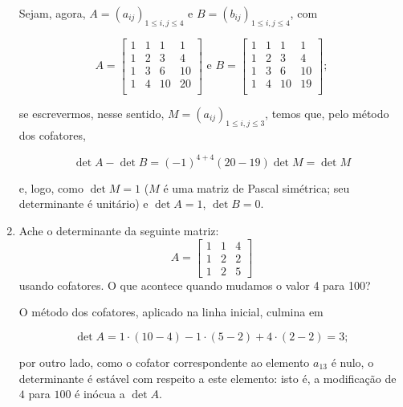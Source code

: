 \documentclass[leqno]{article}
\begin{document}
\begin{enumerate}
\begin{sol}
	Sejam, agora, $A = (a_{ij})_{1 \le i, j \le 4}$ e $B = (b_{ij})_{1 \le i, j \le 4}$, com 

	\begin{equation*} 
		A = 
		\begin{bmatrix} 
			1 & 1 & 1 & 1 \\ 
			1 & 2 & 3 & 4 \\ 
			1 & 3 & 6 & 10 \\ 
			1 & 4 & 10 & 20 \\ 
		\end{bmatrix} 
		\text{ e } 
		B = 
		\begin{bmatrix} 
			1 & 1 & 1 & 1 \\ 
			1 & 2 & 3 & 4 \\ 
			1 & 3 & 6 & 10 \\ 
			1 & 4 & 10 & 19 \\ 
		\end{bmatrix};  
	\end{equation*} 

	\noindent se escrevermos, nesse sentido, $M = (a_{ij})_{1 \le i, j \le 3}$, temos que, pelo método dos cofatores, 

	\begin{equation*} 
		\det A - \det B = (-1)^{4 + 4}(20 - 19) \det M = \det M 
	\end{equation*} 

	\noindent e, logo, como $\det M = 1$ ($M$ é uma matriz de Pascal simétrica; seu determinante é unitário) e $\det A = 1$, $\det B = 0$.

\end{sol}


\item Ache o determinante da seguinte matriz:
$$A = \begin{bmatrix} 1 & 1 & 4 \\ 1 & 2 & 2 \\ 1 & 2 & 5   \end{bmatrix}$$
usando cofatores. O que acontece quando mudamos o valor 4 para 100?

\begin{sol}
	O método dos cofatores, aplicado na linha inicial, culmina em 

	\begin{equation*} 
		\det A = 1 \cdot (10 - 4) - 1 \cdot (5 - 2) + 4 \cdot (2 - 2) = 3; 
	\end{equation*} 

	\noindent por outro lado, como o cofator correspondente ao elemento $a_{13}$ é nulo, o determinante é estável com respeito a este elemento: isto é, a modificação de $4$ para $100$ é inócua a $\det A$. 

\end{sol}

\end{enumerate}
\end{document}
